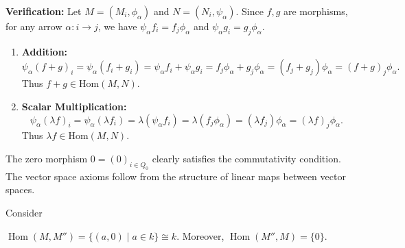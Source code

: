 \documentclass[11pt, a4paper]{report}
\begin{document}
\textbf{Verification:} Let $M=(M_i, \phi_\alpha)$ and $N=(N_i, \psi_\alpha)$. Since $f,g$ are morphisms, for any arrow $\alpha: i \to j$, we have $\psi_\alpha f_i = f_j \phi_\alpha$ and $\psi_\alpha g_i = g_j \phi_\alpha$.
\begin{enumerate}
    \item \textbf{Addition:}
          \[
              \psi_\alpha (f+g)_i = \psi_\alpha (f_i + g_i) = \psi_\alpha f_i + \psi_\alpha g_i = f_j \phi_\alpha + g_j \phi_\alpha = (f_j + g_j) \phi_\alpha = (f+g)_j \phi_\alpha.
          \]
          Thus $f+g \in \mathrm{Hom}(M,N)$.
    \item \textbf{Scalar Multiplication:}
          \[
              \psi_\alpha (\lambda f)_i = \psi_\alpha (\lambda f_i) = \lambda (\psi_\alpha f_i) = \lambda (f_j \phi_\alpha) = (\lambda f_j) \phi_\alpha = (\lambda f)_j \phi_\alpha.
          \]
          Thus $\lambda f \in \mathrm{Hom}(M,N)$.
\end{enumerate}
The zero morphism $0=(0)_{i \in Q_0}$ clearly satisfies the commutativity condition. The vector space axioms follow from the structure of linear maps between vector spaces.

\begin{example}
    Consider
    \begin{center}
    \end{center}
    $\operatorname{Hom}(M,M'') = \{(a,0) \mid a \in k\} \cong k$. Moreover, $\operatorname{Hom}(M'',M) = \{0\}$.
\end{example}
\end{document}
